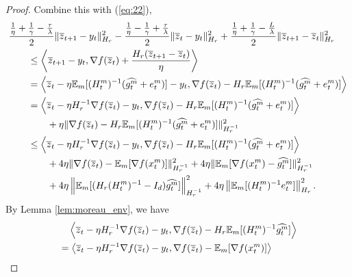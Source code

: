 \documentclass{article} %
\numberwithin{equation}{section}
\renewcommand{\eqref}[1]{(\ref{#1})}
\begin{document}
\begin{proof}
    Combine this with \eqref{eq:22},
    \begin{equation}\label{eq:23}
        \begin{aligned}
            & \frac{\frac{1}{\eta}+\frac{1}{\gamma}-\frac{\tau}{\lambda}}{2} \|\overline{z}_{t+1}-y_t\|_{H_r}^2 - \frac{\frac{1}{\eta}-\frac{1}{\gamma}+\frac{\tau}{\lambda}}{2} \|\overline{z}_t-y_t\|_{H_r}^2 + \frac{\frac{1}{\eta}+\frac{1}{\gamma}-\frac{L}{\lambda}}{2} \|\overline{z}_{t+1}-\overline{z}_t\|_{H_r}^2 \\
            &\qquad \leq \left\langle \overline{z}_{t+1}-y_t, \nabla f(\overline{z}_t)+\frac{H_r(\overline{z}_{t+1}-\overline{z}_t)}{\eta}\right\rangle \\
            &\qquad = \left\langle \overline{z}_{t}-\eta \mathbb{E}_m[(H_t^m)^{-1}(\widehat{g_t^m}+e_t^m)]-y_t, \nabla f(\overline{z}_t)-H_r\mathbb{E}_m[(H_t^m)^{-1}(\widehat{g_t^m}+e_t^m)]\right\rangle \\
            &\qquad = \left\langle \overline{z}_{t}-\eta H_r^{-1}\nabla f(\overline{z}_t)-y_t, \nabla f(\overline{z}_t)-H_r\mathbb{E}_m[(H_t^m)^{-1}(\widehat{g_t^m}+e_t^m)]\right\rangle \\
            &\qquad\qquad + \eta \|\nabla f(\overline{z}_t)-H_r\mathbb{E}_m[(H_t^m)^{-1}(\widehat{g_t^m}+e_t^m)]\|_{H_r^{-1}}^2 \\
            &\qquad\leq \left\langle \overline{z}_{t}-\eta H_r^{-1}\nabla f(\overline{z}_t)-y_t, \nabla f(\overline{z}_t)-H_r\mathbb{E}_m[(H_t^m)^{-1}(\widehat{g_t^m}+e_t^m)]\right\rangle \\
            &\qquad\qquad + 4\eta \|\nabla f(\overline{z}_t)-\mathbb{E}_m[\nabla f(x_t^m)]\|_{H_r^{-1}}^2 + 4\eta\|\mathbb{E}_m[\nabla f(x_t^m)-\widehat{g_t^m}]\|_{H_r^{-1}}^2 \\
            &\qquad\qquad +4\eta\left\|\mathbb{E}_m[(H_r(H_t^m)^{-1}-I_d)\widehat{g_t^m}]\right\|_{H_r^{-1}}^2+4\eta\left\| \mathbb{E}_m[(H_t^m)^{-1}e_t^m] \right\|_{H_r}^2.
        \end{aligned}
    \end{equation}
    By Lemma \ref{lem:moreau_env}, we have
    \begin{equation}
        \begin{aligned}
            &\quad \left\langle \overline{z}_{t}-\eta H_r^{-1}\nabla f(\overline{z}_t)-y_t, \nabla f(\overline{z}_t)-H_r\expect_m[(H_t^m)^{-1}\widehat{g_t^m}]\right\rangle \\
            &= \left\langle \overline{z}_{t}-\eta H_r^{-1}\nabla f(\overline{z}_t)-y_t, \nabla f(\overline{z}_t)-\expect_m[\nabla f(x_t^m)]\right\rangle \\

\end{aligned}
\end{equation}
\end{proof}
\end{document}
